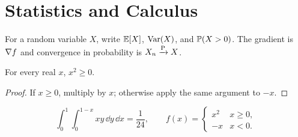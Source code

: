 \documentclass{article}
\begin{document}
\section{Statistics and Calculus}
For a random variable $X$, write $\mathbb{E}[X]$, $\operatorname{Var}(X)$, and $\mathbb{P}(X>0)$.
The gradient is $\nabla f$ and convergence in probability is $X_n\xrightarrow{\mathrm{P}} X$.
\begin{theorem}
For every real $x$, $x^2\geq 0$.
\end{theorem}
\begin{proof}
If $x\geq 0$, multiply by $x$; otherwise apply the same argument to $-x$.
\end{proof}
\[
\int_0^1\int_0^{1-x}xy\,\dd y\,\dd x=\frac{1}{24},
\qquad
f(x)=\begin{cases}x^2 & x\geq0,\\-x & x<0.\end{cases}
\]
\end{document}
